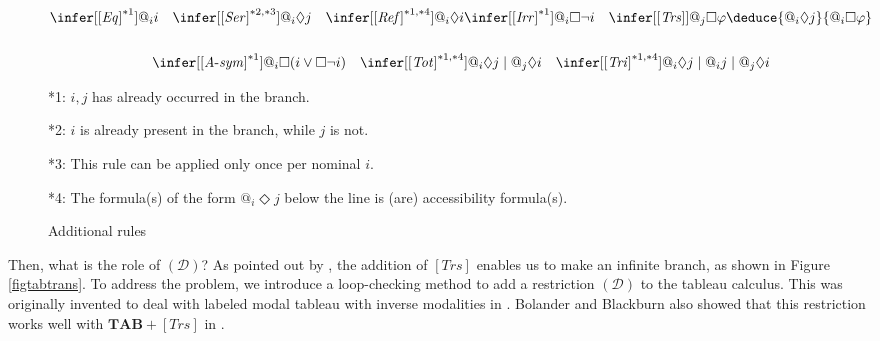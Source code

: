 \documentclass{article}
\theoremstyle{definition}
\newcommand{\Dia}{\Diamond}
\newcommand{\tableau}{\mathbf{TAB}}
\newcommand{\Drest}{(\mathcal{D})}
\newcommand{\reflex}{\mathit{Ref}}
\newcommand{\irr}{\mathit{Irr}}
\newcommand{\trans}{\mathit{Trs}}
\newcommand{\ser}{\mathit{Ser}}
\newcommand{\antisym}{\mathit{A\text{-}sym}}
\newcommand{\trich}{\mathit{Tri}}
\newcommand{\total}{\mathit{Tot}}
\newcommand{\reflexivity}{\mathit{Eq}}
\begin{document}
\begin{figure}[tbp]
  \begin{gather*}
    \infer[{[\reflexivity]}^{*1}]
        {@_i i}
        { }
    \quad
    \infer[{[\ser]}^{*2, *3}]
        {@_i \Dia j}
        { }
    \quad
    \infer[{[\reflex]}^{*1, *4}]
        {@_i \Dia i}
        { }
    \infer[{[\irr]}^{*1}]
        {@_i \Box \neg i}
        { }
    \quad    
    \infer[{[\trans]}]
        {@_j \Box \varphi}
        {\deduce{@_i \Dia j}{@_i \Box \varphi}} \\
    \\
    \infer[{[\antisym]}^{*1}]
        {@_i \Box (i \lor \Box \neg i)}
        { }
    \quad
    \infer[{[\total]}^{*1, *4}]
        {@_i \Dia j \mid @_j \Dia i}
        { }
    \quad
    \infer[{[\trich]}^{*1, *4}]
        {@_i \Dia j \mid @_i j \mid @_j \Dia i}
        { }
  \end{gather*}

  *1: $i, j$ has already occurred in the branch.

  *2: $i$ is already present in the branch, while $j$ is not.

  *3: This rule can be applied only once per nominal $i$.

  *4: The formula(s) of the form $@_i \Dia j$ below the line is (are) accessibility formula(s).
  \caption{Additional rules}
  \label{figrulesadd}
\end{figure}

Then, what is the role of $\Drest$? As pointed out by \cite{bolander2009}, the addition of $[\trans]$ enables us to make an infinite branch, as shown in Figure \ref{figtabtrans}. To address the problem, we introduce a loop-checking method to add a restriction $\Drest$ to the tableau calculus. This was originally invented to deal with labeled modal tableau with inverse modalities in \cite[Section 5.2]{bolander2007}. Bolander and Blackburn also showed that this restriction works well with $\tableau + [\trans]$ in \cite[Section 7]{bolander2009}.
\end{document}
